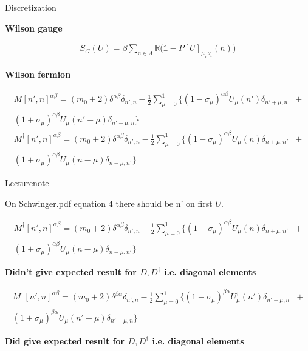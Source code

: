 \documentclass[10pt]{beamer}
\begin{document}
 \begin{frame}{Discretization}
     \begin{center} \textbf{Wilson gauge}\end{center}
     \begin{align}
        S_G(U) = \beta\sum\limits_{n\in\Lambda}\mathbb{R}\big(\mathbb{1} - P[U]_{\mu_x\nu_t}(n)\big)
    \end{align}
     \begin{center} \textbf{Wilson fermion}\end{center}
     \begin{align}
        M[n',n]^{\alpha\beta} = (m_0+2)\delta^{\alpha\beta}\delta_{n',n} -\frac{1}{2}\sum\limits_{\mu=0}^{1}\{(1-\sigma_\mu)^{\alpha\beta}U_{\mu}(n')\delta_{n'+\mu,n} &+ \nonumber\\
        (1+\sigma_\mu)^{\alpha\beta}U^{\dagger}_{\mu}(n'-\mu)\delta_{n'-\mu,n}  \}\\
        M^{\dagger}[n',n]^{\alpha\beta} = (m_0+2)\delta^{\alpha\beta}\delta_{n',n} -\frac{1}{2}\sum\limits_{\mu=0}^{1}\{(1-\sigma_\mu)^{\alpha\beta}U^{\dagger}_{\mu}(n)\delta_{n+\mu,n'} &+  \nonumber \\
        (1+\sigma_\mu)^{\alpha\beta}U_{\mu}(n-\mu)\delta_{n-\mu,n'}  \}
    \end{align}

 \end{frame}

 \begin{frame} {Lecturenote}
     \begin{center}
        On Schwinger.pdf equation 4 there should be n' on first $U$.
    \end{center}
    \begin{align}
        M^{\dagger}[n',n]^{\alpha\beta} = (m_0+2)\delta^{\alpha\beta}\delta_{n',n} -\frac{1}{2}\sum\limits_{\mu=0}^{1}\{(1-\sigma_\mu)^{\alpha\beta}U^{\dagger}_{\mu}(n)\delta_{n+\mu,n'} &+  \nonumber \\
        (1+\sigma_\mu)^{\alpha\beta}U_{\mu}(n-\mu)\delta_{n-\mu,n'}  \}\end{align}
     \begin{center}
            \textbf{Didn't give expected result for $D,D^{\dagger}$ i.e. diagonal elements}\end{center}
    \begin{align}
        M^{\dagger}[n',n]^{\alpha\beta} = (m_0+2)\delta^{\beta\alpha}\delta_{n',n} -\frac{1}{2}\sum\limits_{\mu=0}^{1}\{(1-\sigma_\mu)^{\beta\alpha}U^{\dagger}_{\mu}(n')\delta_{n'+\mu,n} &+  \nonumber \\
        (1+\sigma_\mu)^{\beta\alpha}U_{\mu}(n'-\mu)\delta_{n'-\mu,n}  \} 
    \end{align}\begin{center}
        \textbf{Did give expected result for $D,D^{\dagger}$ i.e. diagonal elements}\end{center}
    
    
 \end{frame}
\end{document}

